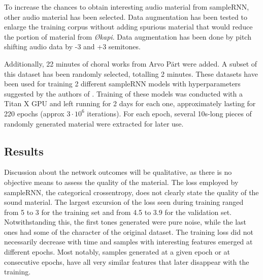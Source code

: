 To increase the chances to obtain interesting audio material from sampleRNN, other audio material has been selected. Data augmentation has been tested to enlarge the training corpus without adding spurious material that would reduce the portion of material from \textit{\O kapi}. Data augmentation has been done by pitch shifting audio data by -3 and +3 semitones. 

Additionally, 22 minutes of choral works from Arvo P\"art were added. A subset of this dataset has been randomly selected, totalling 2 minutes. These datasets have been used for training 2 different sampleRNN models with hyperparameters suggested by the authors of \cite{mehri2016samplernn}. Training of these models was conducted with a Titan X GPU and left running for 2 days for each one, approximately lasting for 220 epochs (approx $3 \cdot 10^6$ iterations). For each epoch, several 10s-long pieces of randomly generated material were extracted for later use. 

\subsection{Results}
Discussion about the network outcomes will be qualitative, as there is no objective means to assess the quality of the material. The loss employed by sampleRNN, the categorical crossentropy, does not clearly state the quality of the sound material. The largest excursion of the loss seen during training ranged from 5 to 3 for the training set and from 4.5 to 3.9 for the validation set. Notwithstanding this, the first tones generated were pure noise, while the last ones had some of the character of the original dataset. The training loss did not necessarily decrease with time and samples with interesting features emerged at different epochs. Most notably, samples generated at a given epoch or at consecutive epochs, have all very similar features that later disappear with the training.

